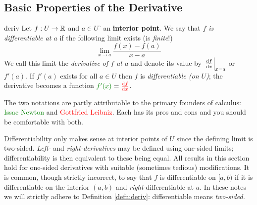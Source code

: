 \subsection{Basic Properties of the Derivative}\label{sec:derivproperties}

\begin{defn}{}{deriv}
	Let $f:U\to\R$ and $a\in U^\circ$ an \textbf{interior point}. We say that \emph{$f$ is differentiable at $a$} if the following limit exists (is \emph{finite}!)
	\[
		\lim_{x\to a}\frac{f(x)-f(a)}{x-a}
	\]
	We call this limit the \emph{derivative of $f$ at $a$} and denote its value by $\diffat[f]{x}{x=a}$ or $f'(a)$.\smallbreak
	If $f'(a)$ exists for all $a\in U$ then $f$ is \emph{differentiable (on $U$)}; the derivative becomes a function $\textcolor{Green}{f'(x)}=\textcolor{red}{\diff[f]{x}}$.
\end{defn}

The two notations are partly attributable to the primary founders of calculus: \textcolor{Green}{Issac Newton} and \textcolor{red}{Gottfried Leibniz}. Each has its pros and cons and you should be comfortable with both.


Differentiability only makes sense at interior points of $U$ since the defining limit is two-sided. \emph{Left-} and \emph{right-derivatives} may be defined using one-sided limits; differentiability is then equivalent to these being equal. All results in this section hold for one-sided derivatives with suitable (sometimes tedious) modifications. It is common, though strictly incorrect, to say that $f$ is differentiable on $[a,b)$ if it is differentiable on the interior $(a,b)$ and \emph{right-}differentiable at $a$. In these notes we will strictly adhere to Definition \ref{defn:deriv}: differentiable means \emph{two-sided.}


